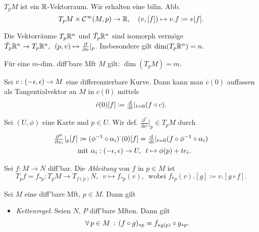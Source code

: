 \documentclass{cheat-sheet}
\newcommand{\vinterval}{\ointerval{-\epsilon}{\epsilon}} %
\newcommand{\Cont}{\mathcal{C}} %
\begin{document}
\begin{bem}
  $T_p M$ ist ein $\mathbb{R}$-Vektorraum.
  Wir erhalten eine bilin. Abb.
  \[
    T_p M \times \Cont^\infty(M, p) \to \R, \quad
    (v, [f]) \mapsto v.f \coloneqq v[f].
  \]
\end{bem}

\begin{satz}
  Die Vektorräume $T_p \mathbb{R}^n$ und $\tilde{T}_p \mathbb{R}^n$ sind isomorph vermöge $\tilde{T}_p \mathbb{R}^n \to T_p \mathbb{R}^n, \enspace (p, v) \mapsto \tfrac{\partial}{\partial v} |_p$. Insbesondere gilt $\dim(T_p \mathbb{R}^n) = n$.
\end{satz}

\begin{kor}
  Für eine $m$-dim. diff'bare Mft $M$ gilt: $\dim(T_p M) = m$.
\end{kor}

\begin{bem}
  Sei $c : \vinterval \to M$ eine differenzierbare Kurve. Dann kann man $\dot{c}(0)$ auffassen als Tangentialvektor an $M$ in $c(0)$ mittels
  \[ \dot{c}(0)[f] \coloneqq \tfrac{\mathrm{d}}{\mathrm{d} t}|_{t=0} (f \circ c). \]
\end{bem}

\begin{bem}
  Sei $(U, \phi)$ eine Karte und $p \in U$. Wir def. $\tfrac{\partial^\phi}{\partial x^i}|_{p} \in T_p M$ durch
  \begin{align*}
    \tfrac{\partial^{\phi}}{\partial x_i}|_p [f] & \coloneqq (\phi^{-1} \circ \alpha_i)^{{\cdot}} (0) [f] = \tfrac{\mathrm{d}}{\mathrm{d} t}|_{t=0} (f \circ \phi^{-1} \circ \alpha_i)\\
    & \text{mit } \alpha_i : \left( -\epsilon, \epsilon \right) \to U, \enspace t \mapsto \phi(p) + t e_i.
  \end{align*}
\end{bem}

\begin{defn}
  Sei $f : M \to N$ diff'bar. Die \emph{Ableitung} von $f$ in $p \in M$ ist %
  \[
    T_p f \!=\! f_{*p} : T_p M \to T_{f(p)} N, \enspace v \mapsto f_{*p}(v), \enspace
    \text{wobei } f_{*p}(v).[g] \coloneqq v.[g \circ f].
  \]
\end{defn}

\begin{lem}
  Sei $M$ eine diff'bare Mft, $p \in M$. Dann gilt
  \begin{itemize}
    \item \textit{Kettenregel}: Seien $N$, $P$ diff'bare Mften. Dann gilt
    \[ \forall \, {p \in M} \,:\, (f \circ g)_{*p} = f_{* g(p)} \circ g_{*p}. \]
  \end{itemize}
\end{lem}
\end{document}
